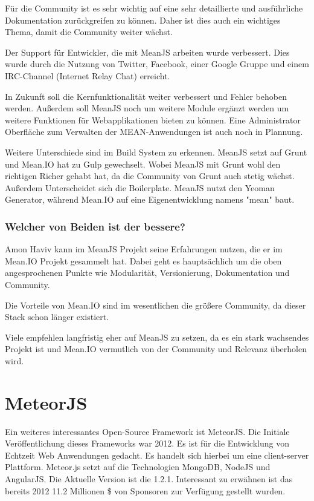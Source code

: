 Für die Community ist es sehr wichtig auf eine sehr detaillierte und ausführliche Dokumentation zurückgreifen zu können. Daher ist dies auch ein wichtiges Thema, damit die Community weiter wächst.

Der Support für Entwickler, die mit MeanJS arbeiten wurde verbessert. Dies wurde durch die Nutzung von Twitter, Facebook, einer Google Gruppe und einem IRC-Channel (Internet Relay Chat) erreicht.

In Zukunft soll die Kernfunktionalität weiter verbessert und Fehler behoben werden. Außerdem soll MeanJS noch um weitere Module ergänzt werden um weitere Funktionen für Webapplikationen bieten zu können. Eine Administrator Oberfläche zum Verwalten der MEAN-Anwendungen ist auch noch in Plannung.

\cite{meanJS:blog} \cite{meanJS:article}

Weitere Unterschiede sind im Build System zu erkennen. MeanJS setzt auf Grunt und Mean.IO hat zu Gulp gewechselt.
Wobei MeanJS mit Grunt wohl den richtigen Richer gehabt hat, da die Community von Grunt auch stetig wächst.
Außerdem Unterscheidet sich die Boilerplate. MeanJS nutzt den Yeoman Generator, während Mean.IO auf eine Eigenentwicklung namens "mean" baut.

\subsubsection{Welcher von Beiden ist der bessere?}

Amon Haviv kann im MeanJS Projekt seine Erfahrungen nutzen, die er im Mean.IO Projekt gesammelt hat.
Dabei geht es hauptsächlich um die oben angesprochenen Punkte wie Modularität, Versionierung, Dokumentation und Community.

Die Vorteile von Mean.IO sind im wesentlichen die größere Community, da dieser Stack schon länger existiert.

Viele empfehlen langfristig eher auf MeanJS zu setzen, da es ein stark wachsendes Projekt ist und Mean.IO vermutlich von der Community und Relevanz überholen wird. \cite{meanJS:article}

\section{MeteorJS}\label{meteor.js}

Ein weiteres interessantes Open-Source Framework ist MeteorJS. Die
Initiale Veröffentlichung dieses Frameworks war 2012. Es ist für die
Entwicklung von Echtzeit Web Anwendungen gedacht. Es handelt sich
hierbei um eine client-server Plattform. Meteor.js setzt auf die
Technologien MongoDB, NodeJS und AngularJS. Die Aktuelle Version ist
die 1.2.1. Interessant zu erwähnen ist das bereits 2012 11.2 Millionen
\$ von Sponsoren zur Verfügung gestellt wurden.
	
